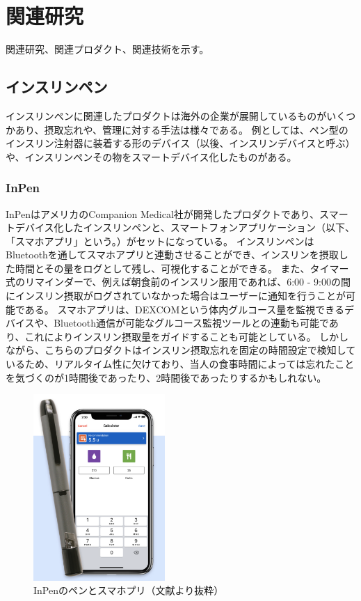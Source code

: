 \chapter{関連研究}
\label{chap:related_works}

関連研究、関連プロダクト、関連技術を示す。

\section{インスリンペン}

インスリンペンに関連したプロダクトは海外の企業が展開しているものがいくつかあり、摂取忘れや、管理に対する手法は様々である。
例としては、ペン型のインスリン注射器に装着する形のデバイス（以後、インスリンデバイスと呼ぶ）や、インスリンペンその物をスマートデバイス化したものがある。

\subsection{InPen}

InPenはアメリカのCompanion Medical社が開発したプロダクトであり、スマートデバイス化したインスリンペンと、スマートフォンアプリケーション（以下、「スマホアプリ」という。）がセットになっている。
インスリンペンはBluetoothを通してスマホアプリと連動させることができ、インスリンを摂取した時間とその量をログとして残し、可視化することができる。
また、タイマー式のリマインダーで、例えば朝食前のインスリン服用であれば、6:00 - 9:00の間にインスリン摂取がログされていなかった場合はユーザーに通知を行うことが可能である。
スマホアプリは、DEXCOMという体内グルコース量を監視できるデバイスや、Bluetooth通信が可能なグルコース監視ツールとの連動も可能であり、これによりインスリン摂取量をガイドすることも可能としている。
しかしながら、こちらのプロダクトはインスリン摂取忘れを固定の時間設定で検知しているため、リアルタイム性に欠けており、当人の食事時間によっては忘れたことを気づくのが1時間後であったり、2時間後であったりするかもしれない。

\begin{figure}[htbp]
  \caption{InPenのペンとスマホプリ（文献\cite{inpen}より抜粋）}
  \label{fig:inpen_display}
  \begin{center}
    \includegraphics[bb=0 0 400 600,width=5cm]{assets/inpen_display.png}
  \end{center}
\end{figure}


